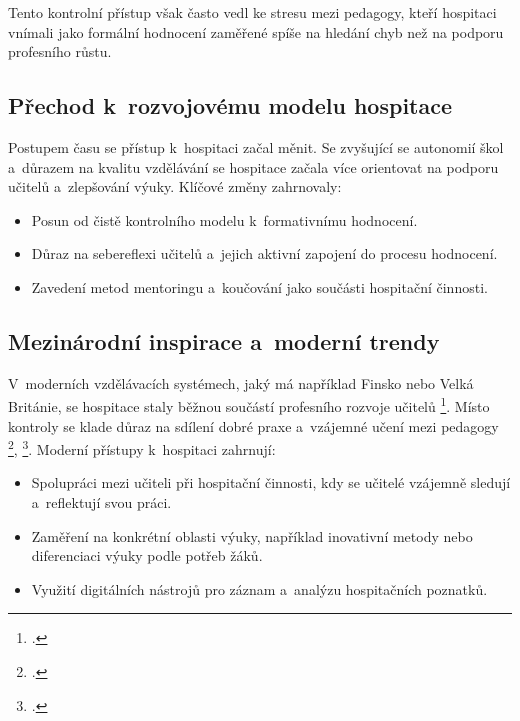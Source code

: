 Tento kontrolní přístup však často vedl ke stresu mezi pedagogy, kteří hospitaci vnímali jako formální hodnocení zaměřené spíše na hledání chyb než na podporu profesního růstu.

\subsection{Přechod k~rozvojovému modelu hospitace}

Postupem času se přístup k~hospitaci začal měnit. Se zvyšující se autonomií škol a~důrazem na kvalitu vzdělávání se hospitace začala více orientovat na podporu učitelů a~zlepšování výuky. Klíčové změny zahrnovaly:

\begin{itemize}
    \item Posun od čistě kontrolního modelu k~formativnímu hodnocení.

    \item Důraz na sebereflexi učitelů a~jejich aktivní zapojení do procesu hodnocení.

    \item Zavedení metod mentoringu a~koučování jako součásti hospitační činnosti.
\end{itemize}

\subsection{Mezinárodní inspirace a~moderní trendy}

V~moderních vzdělávacích systémech, jaký má například Finsko nebo Velká Británie, se hospitace staly běžnou součástí profesního rozvoje učitelů \footcite{autoevaluace-zahranici}. Místo kontroly se klade důraz na sdílení dobré praxe a~vzájemné učení mezi pedagogy \footcite{ucime-ucit-se}, \footcite{metody-a-formy}. Moderní přístupy k~hospitaci zahrnují:

\begin{itemize}
    \item Spolupráci mezi učiteli při hospitační činnosti, kdy se učitelé vzájemně sledují a~reflektují svou práci.

    \item Zaměření na konkrétní oblasti výuky, například inovativní metody nebo diferenciaci výuky podle potřeb žáků.

    \item Využití digitálních nástrojů pro záznam a~analýzu hospitačních poznatků.
\end{itemize}

